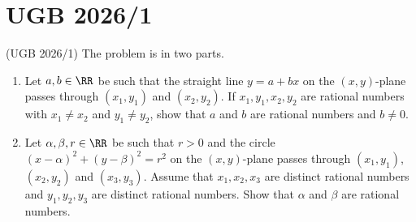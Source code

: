 \documentclass[numbers=endperiod, 11pt]{scrartcl}
\begin{document}
\section{UGB 2026/1}

\begin{prob}{(UGB 2026/1)}{}
    The problem is in two parts.
    \begin{enumerate}[label=\alph*)]
        \item Let $a, b \in \RR$ be such that
              the straight line $y = a + bx$ on the
              $(x, y)$-plane passes through
              $(x_1, y_1)$ and $(x_2, y_2)$. If
              $x_1, y_1, x_2, y_2$ are rational
              numbers with $x_1 \neq x_2$ and
              $y_1 \neq y_2$, show that $a$ and $b$ are
              rational numbers and $b \neq 0$.
        \item Let $\alpha, \beta, r \in \RR$ be such
              that $r > 0$ and the circle
              $(x - \alpha)^2 + (y - \beta)^2 = r^2$ on
              the $(x, y)$-plane passes through
              $(x_1, y_1)$, $(x_2, y_2)$ and
              $(x_3, y_3)$. Assume that $x_1, x_2, x_3$
              are distinct rational numbers and
              $y_1, y_2, y_3$ are distinct rational
              numbers. Show that $\alpha$ and $\beta$
              are rational numbers.
    \end{enumerate}
\end{prob}
\end{document}

